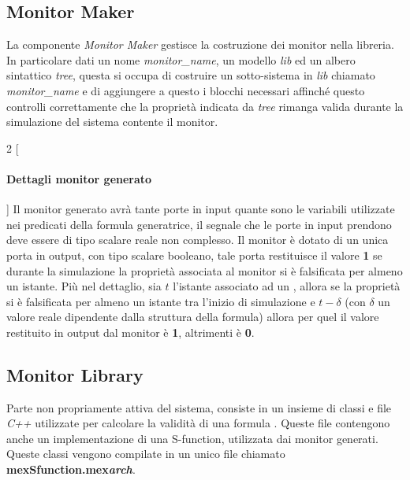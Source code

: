 \documentclass[10pt,a4paper]{article}
\newcommand{\MonMakertx}{{Monitor Maker}}
\newcommand{\MonLibrtx}{{Monitor Library}}
\newcommand{\MonMaker}{\emph{\MonMakertx}}
\newcommand{\MexSFunction}{\textbf{mexSfunction.mex\emph{arch}}}
\begin{document}
	\subsection*{\MonMakertx}
	La componente \MonMaker{} gestisce la costruzione dei monitor nella libreria. In particolare dati un nome \emph{monitor\_name}, un modello \Simulink{} \emph{lib} ed un albero sintattico \emph{tree}, questa si occupa di costruire un sotto-sistema in \emph{lib} chiamato \emph{monitor\_name} e di aggiungere a questo i blocchi necessari affinché questo controlli correttamente che la proprietà indicata da \emph{tree} rimanga valida durante la simulazione del sistema contente il monitor.
	
	\begin{multicols}{2}
	[\paragraph{Dettagli monitor generato}]
	Il monitor generato avrà tante porte in input quante sono le variabili utilizzate nei predicati della formula generatrice, il segnale che le porte in input prendono deve essere di tipo scalare reale non complesso. Il monitor è dotato di un unica porta in output, con tipo scalare booleano, tale porta restituisce il valore \textbf{1} se durante la simulazione la proprietà associata al monitor si è falsificata per almeno un istante. Più nel dettaglio, sia $t$ l'istante associato ad un \Mstep, allora se la proprietà si è falsificata per almeno un istante tra l'inizio di simulazione e $t-\delta$ (con $\delta$ un valore reale dipendente dalla struttura della formula) allora per quel \Mstep{} il valore restituito in output dal monitor è \textbf{1}, altrimenti è \textbf{0}.
		\end{multicols}
	
	\subsection*{\MonLibrtx}
	Parte non propriamente attiva del sistema, consiste in un insieme di classi e file \emph{C++} utilizzate per  calcolare la validità di una formula \BLTLstar{}. Queste file contengono anche un implementazione di una S-function, utilizzata dai monitor generati.
	Queste classi vengono compilate in un unico \Mex{} file chiamato \MexSFunction{}.
	
\end{document}

